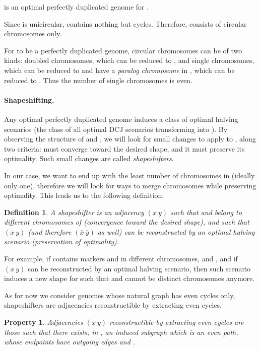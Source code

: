\documentclass[11pt,final,twoside,nofrench]{thlifl}
\newcommand{\fst}[1]{ \ensuremath{#1} }
\newcommand{\snd}[1]{ \ensuremath{\overline{#1}} }
\newcommand\aff[2]{\ensuremath{(\fst{#1}~\fst{#2})}}
\newcommand\ass[2]{\ensuremath{(\snd{#1}~\snd{#2})}}
\newtheorem{property}{Property}
\newtheorem{definition}{Definition}
\begin{document}
{ is an optimal perfectly duplicated genome for .

Since  is unicircular,  contains nothing but cycles.
Therefore,  consists of circular chromosomes only.

For  to be a perfectly duplicated genome, circular chromosomes can
be of two kinds: doubled chromosomes, which can be reduced to
, and single chromosomes, which can be reduced to 
and have a \emph{paralog chromosome} in , which can be reduced to
. Thus the number of single chromosomes is even.

\paragraph{Shapeshifting.}

Any optimal perfectly duplicated genome  induces a class
 of optimal halving scenarios (the class of all optimal
DCJ scenarios transforming  into ). By observing the structure
of  and , we will look for small changes to apply to
, along two criteria:  must converge toward the
desired shape, and it must preserve its optimality.  Such small
changes are called \emph{shapeshifters}.

In our case, we want to end up with the least number of chromosomes in
 (ideally only one), therefore we will look for ways to merge
chromosomes while preserving optimality. This leads us to the
following definition:

\begin{definition}
A shapeshifter is an adjacency \aff{x}{y} such that  and  belong to \emph{different chromosomes} of  (convergence toward the desired shape), and such that \aff{x}{y} (and therefore \ass{x}{y} as well) can be reconstructed by an optimal halving scenario (preservation of optimality).
\end{definition}

For example, if  contains markers  and  in different
chromosomes,  and , and if \aff{x}{y} can be reconstructed
by an optimal halving scenario, then such scenario induces a new shape
for  such that  and  cannot be distinct chromosomes
anymore.

As for now we consider genomes whose natural graph has even cycles only, shapeshifters are adjacencies reconstructible by extracting even cycles.

\begin{property}
Adjacencies \aff{x}{y} reconstructible by extracting even cycles are those such that there exists, in , an induced subgraph which is an \emph{even} path, whose endpoints have outgoing edges  and .
\end{property}

}
\end{document}
